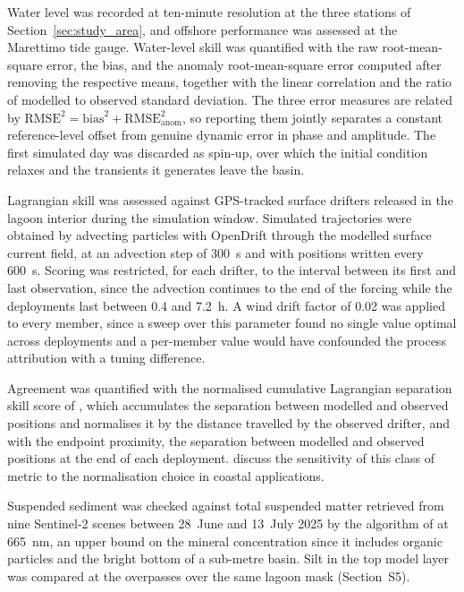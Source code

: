 Water level was recorded at ten-minute resolution at the three stations of
Section~\ref{sec:study_area}, and offshore performance was assessed at the
Marettimo tide gauge. Water-level skill was quantified with the raw
root-mean-square error, the
bias, and the anomaly root-mean-square error computed after removing the
respective means, together with the linear correlation and the ratio of
modelled to observed standard deviation. The three error measures are related
by $\mathrm{RMSE}^2 = \mathrm{bias}^2 + \mathrm{RMSE}_{\mathrm{anom}}^2$, so
reporting them jointly separates a constant reference-level offset from
genuine dynamic error in phase and amplitude. The first simulated day was
discarded as spin-up, over which the initial condition relaxes and the
transients it generates leave the basin.

Lagrangian skill was assessed against GPS-tracked surface drifters released in
the lagoon interior during the simulation window. Simulated trajectories were
obtained by advecting particles with OpenDrift \citep{Dagestad2018} through the
modelled surface current field, at an advection step of 300~s and with
positions written every 600~s. Scoring was restricted, for each drifter, to
the interval between its first and last observation, since the advection
continues to the end of the forcing while the deployments last between 0.4 and
7.2~h. A wind drift factor of 0.02 was applied to every member, since a sweep
over this parameter found no single value optimal across deployments and a
per-member value would have confounded the process attribution with a tuning
difference.

Agreement was quantified with the normalised cumulative
Lagrangian separation skill score of \citet{Liu2011}, which accumulates the
separation between modelled and observed positions and normalises it by the
distance travelled by the observed drifter, and with the endpoint proximity,
the separation between modelled and observed positions at the end of each
deployment. \citet{Revelard2021} discuss the sensitivity of this class of
metric to the normalisation choice in coastal applications.

Suspended sediment was checked against total suspended matter retrieved from
nine Sentinel-2 scenes between 28~June and 13~July 2025 by the algorithm of
\citet{Nechad2010} at 665~nm, an upper bound on the mineral concentration since
it includes organic particles and the bright bottom of a sub-metre basin. Silt
in the top model layer was compared at the overpasses over the same lagoon mask
(Section~S5).

